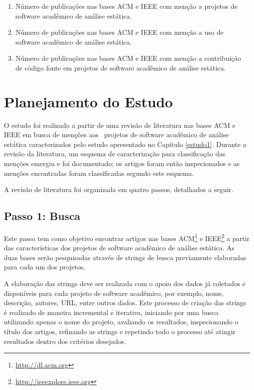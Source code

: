 \begin{enumerate}
  \item Número de publicações nas bases ACM e IEEE com menção a projetos de
    software acadêmico de análise estática.
  \item Número de publicações nas bases ACM e IEEE com menção a uso de
    software acadêmico de análise estática.
  \item Número de publicações nas bases ACM e IEEE com menção a contribuição de
    código fonte em projetos de software acadêmico de análise estática.
\end{enumerate}


\section{Planejamento do Estudo} \label{estudo2:planejamento} %

O estudo foi realizado a partir de uma revisão de literatura nas bases ACM e
IEEE em busca de menções aos \SoftwareCount \ projetos de software acadêmico de
análise estática caracterizados pelo estudo apresentado no Capítulo \ref{estudo1}. 
Durante a revisão da literatura, 
um esquema de caracterização para classificação das menções emergiu e foi documentado;
os artigos foram então inspecionados e as menções encontradas foram classificadas segundo
este esquema.

A revisão de literatura foi organizada em quatro passos, detalhados a seguir.

\subsection{Passo 1: Busca}

Este passo tem como objetivo encontrar artigos nas bases
ACM\footnote{\url{http://dl.acm.org}} e
IEEE\footnote{\url{http://ieeexplore.ieee.org}} a partir das características
dos projetos de software acadêmico de análise estática.
As duas bases serão pesquisadas através de strings de busca previamente
elaboradas para cada um dos projetos.

A elaboração das strings deve ser realizada com o apoio dos dados já coletados
e disponíveis para cada projeto de software acadêmico, por exemplo, nome,
descrição, autores, URL, entre outros dados. Este processo de criação das
strings é realizado de maneira incremental e iterativa, iniciando por uma busca
utilizando apenas o nome do projeto, avaliando os resultados, inspecionando o
título dos artigos, refinando as strings e repetindo todo o processo até
atingir resultados dentro dos critérios desejados.

